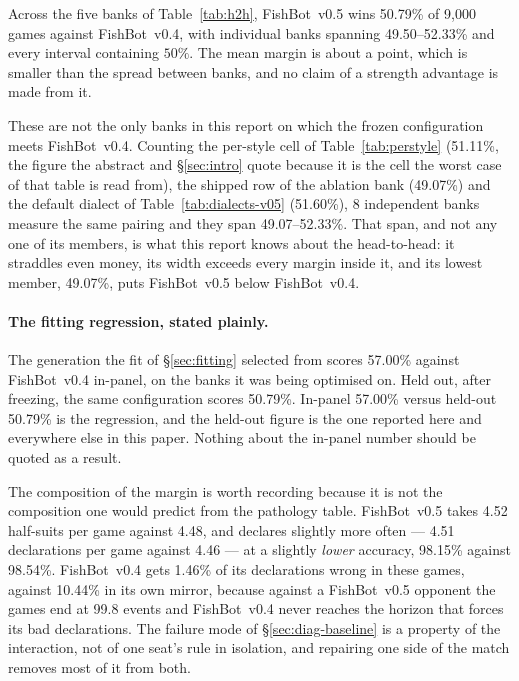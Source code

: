 \documentclass[11pt]{article}
\theoremstyle{definition}
\DeclareRobustCommand{\vfive}{\texorpdfstring{\mbox{FishBot v0.5}}{FishBot v0.5}}
\DeclareRobustCommand{\vfour}{\texorpdfstring{\mbox{FishBot v0.4}}{FishBot v0.4}}
\providecommand{\numFourDeclWrong}{10.44}
\providecommand{\numHeadWin}{50.79}
\providecommand{\numHeadRange}{49.50--52.33}
\providecommand{\numHeadGames}{9{,}000}
\providecommand{\numHeadGames}{9{,}000}
\providecommand{\numPanelVfiveVfour}{51.11}
\providecommand{\numFitWorst}{57.00}
\providecommand{\numHeadDeclAccFive}{98.15}
\providecommand{\numHeadDeclAccFour}{98.54}
\providecommand{\numHeadDeclRateFive}{4.51}
\providecommand{\numHeadDeclRateFour}{4.46}
\providecommand{\numHeadEvents}{99.8}
\providecommand{\numHeadSetsFive}{4.52}
\providecommand{\numHeadSetsFour}{4.48}
\providecommand{\numAblFull}{49.07}
\providecommand{\numDialectDefault}{51.60}
\providecommand{\numHeadDeclErrFour}{1.46}
\providecommand{\numHeadBanks}{8}
\providecommand{\numHeadBankSpan}{49.07--52.33}
\providecommand{\numHeadBankLow}{49.07}
\begin{document}
Across the five banks of Table~\ref{tab:h2h}, \vfive{} wins \numHeadWin\% of
\numHeadGames{} games against \vfour{}, with individual banks spanning
\numHeadRange\% and every interval containing $50\%$. The mean margin is about a
point, which is smaller than the spread between banks, and no claim of a strength
advantage is made from it.

These are not the only banks in this report on which the frozen configuration
meets \vfour{}. Counting the per-style cell of Table~\ref{tab:perstyle}
(\numPanelVfiveVfour\%, the figure the abstract and \S\ref{sec:intro} quote
because it is the cell the worst case of that table is read from), the shipped
row of the ablation bank (\numAblFull\%) and the default dialect of
Table~\ref{tab:dialects-v05} (\numDialectDefault\%), \numHeadBanks{} independent
banks measure the same pairing and they span \numHeadBankSpan\%. That span, and
not any one of its members, is what this report knows about the head-to-head:
it straddles even money, its width exceeds every margin inside it, and its
lowest member, \numHeadBankLow\%, puts \vfive{} below \vfour{}.

\paragraph{The fitting regression, stated plainly.} The generation the fit of
\S\ref{sec:fitting} selected from scores \numFitWorst\% against \vfour{}
in-panel, on the banks it was being optimised on. Held out, after freezing, the
same configuration scores \numHeadWin\%. In-panel \numFitWorst\% versus held-out
\numHeadWin\% is the regression, and the held-out figure is the one reported
here and everywhere else in this paper. Nothing about the in-panel number should
be quoted as a result.

The composition of the margin is worth recording because it is not the
composition one would predict from the pathology table. \vfive{} takes
\numHeadSetsFive{} half-suits per game against \numHeadSetsFour{}, and declares
slightly more often --- \numHeadDeclRateFive{} declarations per game against
\numHeadDeclRateFour{} --- at a slightly \emph{lower} accuracy,
\numHeadDeclAccFive\% against \numHeadDeclAccFour\%. \vfour{} gets
\numHeadDeclErrFour\% of its declarations wrong in these games, against
\numFourDeclWrong\% in its own mirror, because against a \vfive{} opponent the
games end at \numHeadEvents{} events and \vfour{} never reaches the horizon that
forces its bad declarations.
The failure mode of \S\ref{sec:diag-baseline} is a property of the interaction,
not of one seat's rule in isolation, and repairing one side of the match removes
most of it from both.
\end{document}
